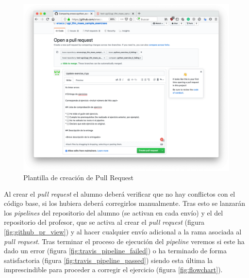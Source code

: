 
\begin{figure}[h!]
\centering
\includegraphics[width=1.0\textwidth]{../images/github_pr_create}
\caption{Plantilla de creación de Pull Request}
\label{fig:github_pr_create}
\end{figure}

Al crear el \textit{pull request} el alumno deberá verificar que no hay conflictos con el código base, si los hubiera deberá corregirlos manualmente. Tras esto se lanzarán los \textit{pipelines} del repositorio del alumno (se activan en cada envío) y el del repositorio del profesor, que se activa al crear el \textit{pull request} (figura \ref{fig:github_pr_view}) y al hacer cualquier envío adicional a la rama asociada al \textit{pull request}. Tras terminar el proceso de ejecución del \textit{pipeline} veremos si este ha dado un error (figura \ref{fig:travis_pipeline_failed}) o ha terminado de forma satisfactoria (figura \ref{fig:travis_pipeline_passed}) siendo esta última la imprescindible para proceder a corregir el ejercicio (figura \ref{fig:flowchart}).

